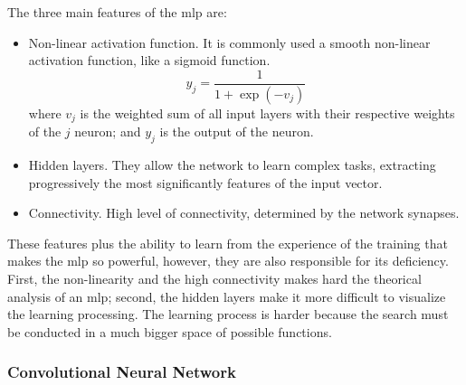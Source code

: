 The three main features of the \gls*{mlp} are:
%
\begin{itemize}
    \item Non-linear activation function. It is commonly used a smooth non-linear activation function, like a sigmoid function.
    \begin{equation}
        y_j = \frac{1}{1+\exp(-v_j)}
        \label{eq:sigmoid_function}
    \end{equation}
    where \(v_j\) is the weighted sum of all input layers with their respective weights of the \(j\) neuron; and \(y_j\) is the output of the neuron.
    \item Hidden layers. They allow the network to learn complex tasks, extracting progressively the most significantly features of the input vector.
    \item Connectivity. High level of connectivity, determined by the network synapses.
\end{itemize}

These features plus the ability to learn from the experience of the training that makes the \gls*{mlp} so powerful, however, they are also responsible for its deficiency. First, the non-linearity and the high connectivity makes hard the theorical analysis of an \gls*{mlp}; second, the hidden layers make it more difficult to visualize the learning processing. The learning process is harder because the search must be conducted in a much bigger space of possible functions.


\subsubsection*{Convolutional Neural Network}

